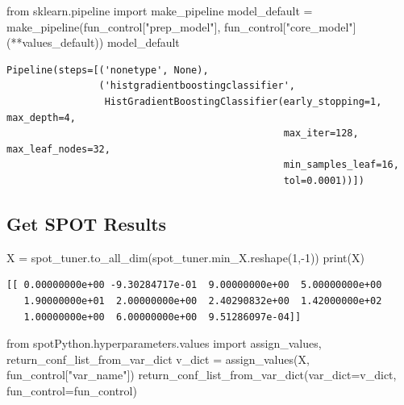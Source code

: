 \documentclass[
  letterpaper,
  DIV=11,
  numbers=noendperiod]{scrreprt}
\newenvironment{Shaded}{\begin{snugshade}}{\end{snugshade}}
\newcommand{\BuiltInTok}[1]{\textcolor[rgb]{0.00,0.23,0.31}{#1}}
\newcommand{\DecValTok}[1]{\textcolor[rgb]{0.68,0.00,0.00}{#1}}
\newcommand{\ImportTok}[1]{\textcolor[rgb]{0.00,0.46,0.62}{#1}}
\newcommand{\NormalTok}[1]{\textcolor[rgb]{0.00,0.23,0.31}{#1}}
\newcommand{\OperatorTok}[1]{\textcolor[rgb]{0.37,0.37,0.37}{#1}}
\newcommand{\StringTok}[1]{\textcolor[rgb]{0.13,0.47,0.30}{#1}}
\begin{document}
\begin{Shaded}
\begin{Highlighting}[]
\ImportTok{from}\NormalTok{ sklearn.pipeline }\ImportTok{import}\NormalTok{ make\_pipeline}
\NormalTok{model\_default }\OperatorTok{=}\NormalTok{ make\_pipeline(fun\_control[}\StringTok{"prep\_model"}\NormalTok{], fun\_control[}\StringTok{"core\_model"}\NormalTok{](}\OperatorTok{**}\NormalTok{values\_default))}
\NormalTok{model\_default}
\end{Highlighting}
\end{Shaded}

\begin{verbatim}
Pipeline(steps=[('nonetype', None),
                ('histgradientboostingclassifier',
                 HistGradientBoostingClassifier(early_stopping=1, max_depth=4,
                                                max_iter=128, max_leaf_nodes=32,
                                                min_samples_leaf=16,
                                                tol=0.0001))])
\end{verbatim}

\hypertarget{get-spot-results-3}{%
\subsection{Get SPOT Results}\label{get-spot-results-3}}

\begin{Shaded}
\begin{Highlighting}[]
\NormalTok{X }\OperatorTok{=}\NormalTok{ spot\_tuner.to\_all\_dim(spot\_tuner.min\_X.reshape(}\DecValTok{1}\NormalTok{,}\OperatorTok{{-}}\DecValTok{1}\NormalTok{))}
\BuiltInTok{print}\NormalTok{(X)}
\end{Highlighting}
\end{Shaded}

\begin{verbatim}
[[ 0.00000000e+00 -9.30284717e-01  9.00000000e+00  5.00000000e+00
   1.90000000e+01  2.00000000e+00  2.40290832e+00  1.42000000e+02
   1.00000000e+00  6.00000000e+00  9.51286097e-04]]
\end{verbatim}

\begin{Shaded}
\begin{Highlighting}[]
\ImportTok{from}\NormalTok{ spotPython.hyperparameters.values }\ImportTok{import}\NormalTok{ assign\_values, return\_conf\_list\_from\_var\_dict}
\NormalTok{v\_dict }\OperatorTok{=}\NormalTok{ assign\_values(X, fun\_control[}\StringTok{"var\_name"}\NormalTok{])}
\NormalTok{return\_conf\_list\_from\_var\_dict(var\_dict}\OperatorTok{=}\NormalTok{v\_dict, fun\_control}\OperatorTok{=}\NormalTok{fun\_control)}
\end{Highlighting}
\end{Shaded}
\end{document}
